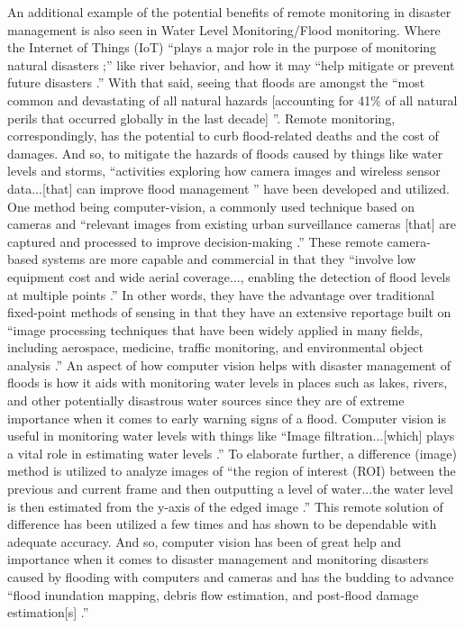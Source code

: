\documentclass[conference]{IEEEtran}
\begin{document}
An additional example of the potential benefits of remote monitoring in disaster management is also seen in Water
Level Monitoring/Flood monitoring. Where the Internet of Things (IoT) ``plays a major role in the purpose of
monitoring natural disasters \cite{b7};'' like river behavior, and how it may ``help mitigate or prevent future
disasters \cite{b6}.'' With that said, seeing that floods are amongst the ``most common and devastating of all
natural hazards [accounting for 41\% of all natural perils that occurred globally in the last decade] \cite{b3}''.
Remote monitoring, correspondingly, has the potential to curb flood-related deaths and the cost of damages.
And so, to mitigate the hazards of floods caused by things like water levels and storms, ``activities exploring
how camera images and wireless sensor data...[that] can improve flood management \cite{b3}'' have been
developed and utilized. One method being computer-vision, a commonly used technique based on cameras and
``relevant images from existing urban surveillance cameras [that] are captured and processed to improve
decision-making \cite{b3}.'' These remote camera-based systems are more capable and commercial in that
they ``involve low equipment cost and wide aerial coverage..., enabling the detection of flood levels at
multiple points \cite{b3}.'' In other words, they have the advantage over traditional fixed-point methods
of sensing in that they have an extensive reportage built on ``image processing techniques that have been
widely applied in many fields, including aerospace, medicine, traffic monitoring, and environmental object
analysis \cite{b3}.'' An aspect of how computer vision helps with disaster management of floods is how
it aids with monitoring water levels in places such as lakes, rivers, and other potentially disastrous
water sources since they are of extreme importance when it comes to early warning signs of a flood.
Computer vision is useful in monitoring water levels with things like ``Image filtration...[which] plays
a vital role in estimating water levels \cite{b3}.'' To elaborate further, a difference (image) method is
utilized to analyze images of ``the region of interest (ROI) between the previous and current frame and
then outputting a level of water...the water level is then estimated from the y-axis of the edged image
\cite{b3}.'' This remote solution of difference has been utilized a few times and has shown to be dependable
with adequate accuracy. And so, computer vision has been of great help and importance when it comes to disaster
management and monitoring disasters caused by flooding with computers and cameras and has the budding to
advance ``flood inundation mapping, debris flow estimation, and post-flood damage estimation[s]
\cite{b3}.''\par
\end{document}
